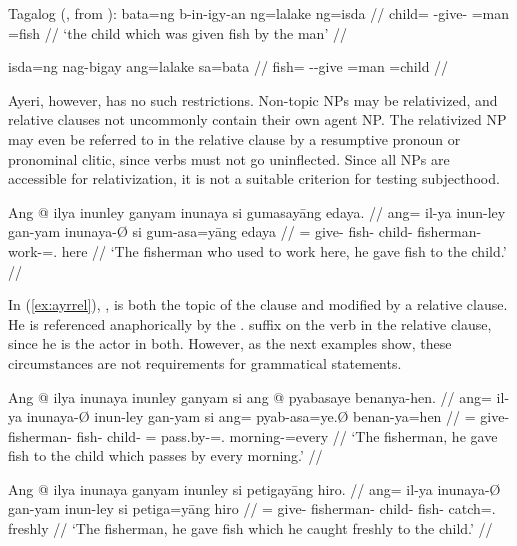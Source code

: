 \pex\label{ex:tagrel}%
Tagalog (\cite[24]{kroeger1991}, from \citet[141--142]{foleyvanvalin1984}):
\a\label{ex:tagrel_1}\begingl
	\gla bata=ng b-in-igy-an ng=lalake ng=isda //
	\glb child=\Lnk{} \Pfv{}-give-\Dv{} \Gen{}=man \Gen{}=fish //
	\glft `the child which was given fish by the man' //
\endgl

\a\label{ex:tagrel_2}\ljudge*\begingl
	\gla isda=ng nag-bigay ang=lalake sa=bata //
	\glb fish=\Lnk{} \Av{}-\Pfv{}-give \Nom{}=man \Dat{}=child //
\endgl

\xe

Ayeri, however, has no such restrictions. Non-topic NPs may be relativized, and
relative clauses not uncommonly contain their own agent NP. The relativized NP
may even be referred to in the relative clause by a resumptive pronoun or
pronominal clitic, since verbs must not go uninflected. Since all NPs are
accessible for relativization, it is not a suitable criterion for testing
subjecthood.

\ex\label{ex:ayrrel}\begingl
	\gla Ang @ ilya inunley ganyam inunaya si gumasayāng edaya. //
	\glb ang= il-ya inun-ley gan-yam inunaya-Ø si gum-asa=yāng edaya //
	\glc \AgtT{}= give-\TsgM{} fish-\PargI{} child-\Dat{} fisherman-\Top{} 
		\Rel{} work-\Hab{}=\TsgM{}.\Aarg{} here //
	\glft `The fisherman who used to work here, he gave fish to the child.' //
\endgl\xe

In (\ref{ex:ayrrel}), , is both the topic
of the clause and modified by a relative clause. He is referenced anaphorically
by the \TsgM{}.\Aarg{} suffix  on the verb in the relative
clause, since he is the actor in both. However, as the next examples show,
these circumstances are not requirements for grammatical statements.

\pex\label{ex:ayrrel2}
\a\label{ex:ayrrel2_1}\begingl
	\gla Ang @ ilya inunaya inunley ganyam si ang @ pyabasaye benanya-hen. //
	\glb ang= il-ya inunaya-Ø inun-ley gan-yam si ang= pyab-asa=ye.Ø 
		benan-ya=hen //
	\glc \AgtT{}= give-\TsgM{} fisherman-\Top{} fish-\PargI{} child-\Dat{}
		\Rel{} \AgtT{}= pass.by-\Hab{}=\TsgF{}.\Top{} morning-\Loc{}=every //
	\glft `The fisherman, he gave fish to the child which passes by every
		morning.' //
\endgl

\a\label{ex:ayrrel2_2}\begingl
	\gla Ang @ ilya inunaya ganyam inunley si petigayāng hiro. //
	\glb ang= il-ya inunaya-Ø gan-yam inun-ley si petiga=yāng hiro //
	\glc \AgtT{}= give-\TsgM{} fisherman-\Top{} child-\Dat{} fish-\PargI{}
		\Rel{} catch=\TsgM{}.\Aarg{} freshly //
	\glft `The fisherman, he gave fish which he caught freshly to the 
		child.' //
\endgl

